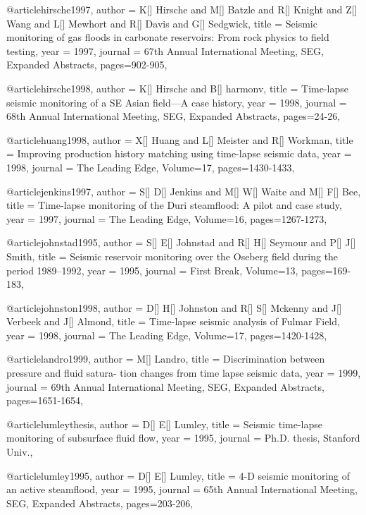 @article{hirsche1997,
  author =	 {K[] Hirsche and M[] Batzle and R[] Knight and Z[] Wang and L[] Mewhort and R[] Davis and G[] Sedgwick},
  title =	 {Seismic monitoring of gas floods in carbonate reservoirs: From rock physics to field testing},
  year =	 1997,
  journal =	 {67th Annual International Meeting, SEG, Expanded Abstracts},
 pages=902-905,
}

@article{hirsche1998,
  author =	 {K[] Hirsche and B[] harmonv},
  title =	 {Time-lapse seismic monitoring of a SE Asian field—A case history},
  year =	 1998,
  journal =	 {68th Annual International Meeting, SEG, Expanded Abstracts},
 pages=24-26,
}

@article{huang1998,
  author =	 {X[] Huang and L[] Meister and R[] Workman},
  title =	 {Improving production history matching using time-lapse seismic data},
  year =	 1998,
  journal =	 {The Leading Edge},
    Volume=17,
 pages=1430-1433,
}

@article{jenkins1997,
  author =	 {S[] D[] Jenkins and M[] W[] Waite and M[] F[] Bee},
  title =	 {Time-lapse monitoring of the Duri steamflood: A pilot and case study},
  year =	 1997,
  journal =	 {The Leading Edge},
    Volume=16,
 pages=1267-1273,
}


@article{johnstad1995,
  author =	 {S[] E[] Johnstad and R[] H[] Seymour and P[] J[] Smith},
  title =	 { Seismic reservoir monitoring over the Oseberg field during the period 1989–1992},
  year =	 1995,
  journal =	 {First Break},
    Volume=13,
 pages=169-183,
}


@article{johnston1998,
  author =	 {D[] H[] Johnston and R[] S[] Mckenny and J[] Verbeek and J[] Almond},
  title =	 {Time-lapse seismic analysis of Fulmar Field},
  year =	 1998,
  journal =	 {The Leading Edge},
    Volume=17,
 pages=1420-1428,
}

@article{landro1999,
  author =	 {M[] Landro},
  title =	 {Discrimination between pressure and fluid satura-
tion changes from time lapse seismic data},
  year =	 1999,
  journal =	 {69th Annual International Meeting, SEG, Expanded Abstracts},
 pages=1651-1654,
}

@article{lumleythesis,
  author =	 {D[] E[] Lumley},
  title =	 {Seismic time-lapse monitoring of subsurface fluid
flow},
  year =	 1995,
  journal =	 {Ph.D. thesis, Stanford Univ.},
}

@article{lumley1995,
  author =	 {D[] E[] Lumley},
  title =	 { 4-D seismic monitoring of an active steamflood},
  year =	 1995,
  journal =	 {65th Annual International Meeting, SEG, Expanded Abstracts},
 pages=203-206,
}

